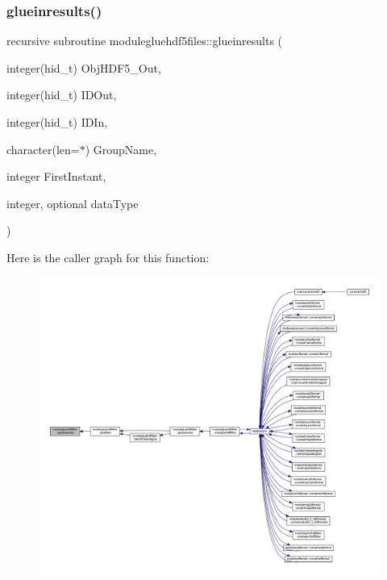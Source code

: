 \subsubsection{\texorpdfstring{glueinresults()}{glueinresults()}}
{\footnotesize\ttfamily recursive subroutine modulegluehdf5files\+::glueinresults (\begin{DoxyParamCaption}\item[{integer(hid\+\_\+t)}]{Obj\+H\+D\+F5\+\_\+\+Out,  }\item[{integer(hid\+\_\+t)}]{I\+D\+Out,  }\item[{integer(hid\+\_\+t)}]{I\+D\+In,  }\item[{character(len=$\ast$)}]{Group\+Name,  }\item[{integer}]{First\+Instant,  }\item[{integer, optional}]{data\+Type }\end{DoxyParamCaption})\hspace{0.3cm}{\ttfamily [private]}}

Here is the caller graph for this function\+:\nopagebreak
\begin{figure}[H]
\begin{center}
\leavevmode
\includegraphics[width=350pt]{namespacemodulegluehdf5files_a3433c6674efedbc9d8386001b56ecbfd_icgraph}
\end{center}
\end{figure}
\mbox{\label{namespacemodulegluehdf5files_af9077091d4ab6580969f5d961ccc9b22}} 
